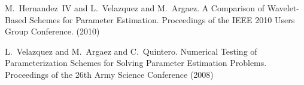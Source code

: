 
\begin{thebibliography}{10}

{\sc M.~Hernandez~IV and L.~Velazquez and M.~Argaez}. {A Comparison of Wavelet-Based Schemes for Parameter Estimation}. Proceedings of the IEEE 2010 Users Group Conference. (2010)

{\sc L.~Velazquez and M.~Argaez and C.~Quintero}. {Numerical Testing of Parameterization Schemes for Solving Parameter Estimation Problems.} Proceedings of the 26th Army Science Conference (2008)

\end{thebibliography}

